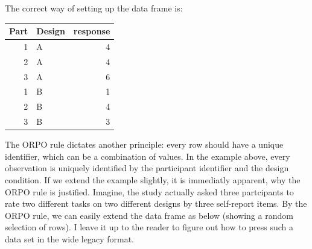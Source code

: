 \documentclass[]{svmono}
\newenvironment{Shaded}{\begin{snugshade}}{\end{snugshade}}
\newcommand{\KeywordTok}[1]{\textcolor[rgb]{0.13,0.29,0.53}{\textbf{#1}}}
\newcommand{\DecValTok}[1]{\textcolor[rgb]{0.00,0.00,0.81}{#1}}
\newcommand{\StringTok}[1]{\textcolor[rgb]{0.31,0.60,0.02}{#1}}
\newcommand{\OperatorTok}[1]{\textcolor[rgb]{0.81,0.36,0.00}{\textbf{#1}}}
\newcommand{\NormalTok}[1]{#1}
\begin{document}
\begin{Shaded}
\end{Shaded}

The correct way of setting up the data frame is:

\begin{Shaded}
\end{Shaded}

\begin{tabular}{r|l|r}
\hline
Part & Design & response\\
\hline
1 & A & 4\\
\hline
2 & A & 4\\
\hline
3 & A & 6\\
\hline
1 & B & 1\\
\hline
2 & B & 4\\
\hline
3 & B & 3\\
\hline
\end{tabular}

The ORPO rule dictates another principle: every row should have a unique
identifier, which can be a combination of values. In the example above,
every observation is uniquely identified by the participant identifier
and the design condition. If we extend the example slightly, it is
immediatly apparent, why the ORPO rule is justified. Imagine, the study
actually asked three partcipants to rate two different tasks on two
different designs by three self-report items. By the ORPO rule, we can
easily extend the data frame as below (showing a random selection of
rows). I leave it up to the reader to figure out how to press such a
data set in the wide legacy format.
\end{document}
